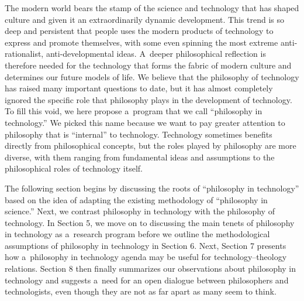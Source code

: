 
The modern world bears the stamp of the science and technology that has shaped culture and given it an extraordinarily dynamic development. This trend is so deep and persistent that people uses the modern products of technology to express and promote themselves, with some even spinning the most extreme anti-rationalist, anti-developmental ideas. A~deeper philosophical reflection is therefore needed for the technology that forms the fabric of modern culture and determines our future models of life. We believe that the philosophy of technology has raised many important questions to date, but it has almost completely ignored the specific role that philosophy plays in the development of technology. To fill this void, we here propose a~program that we call ``philosophy in technology.'' We picked this name because we want to pay greater attention to philosophy that is ``internal'' to technology. Technology sometimes benefits directly from philosophical concepts, but the roles played by philosophy are more diverse, with them ranging from fundamental ideas and assumptions to the philosophical roles of technology itself. 
\parencite[for exampl][]{}%




The following section begins by discussing the roots of ``philosophy in technology'' based on the idea of adapting the existing methodology of ``philosophy in science.'' Next, we contrast philosophy in technology with the philosophy of technology. In Section 5, we move on to discussing the main tenets of philosophy in technology as a~research program before we outline the methodological assumptions of philosophy in technology in Section 6. Next, Section 7 presents how a~philosophy in technology agenda may be useful for technology–theology relations. Section 8 then finally summarizes our observations about philosophy in technology and suggests a~need for an open dialogue between philosophers and technologists, even though they are not as far apart as many seem to think.



